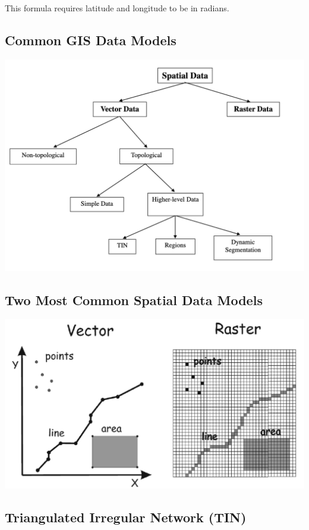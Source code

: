 \documentclass[11pt]{article}
\theoremstyle{definition}
\begin{document}
This formula requires latitude and longitude to be in radians.

\subsection{Common GIS Data Models}
\includegraphics[width=\textwidth/2]{15.png}

\subsection{Two Most Common
Spatial Data Models}

\includegraphics[width=\textwidth/2]{16.png}

\subsection{Triangulated Irregular Network
(TIN)}
\end{document}
